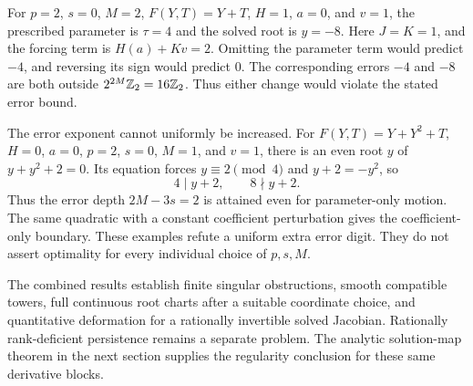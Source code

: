 \begin{example}\label{ex:motion-boundary}
For $p=2$, $s=0$, $M=2$, $F(Y,T)=Y+T$, $H=1$, $a=0$, and $v=1$,
the prescribed parameter is $\tau=4$ and the solved root is $y=-8$.
Here $J=K=1$, and the forcing term is $H(a)+Kv=2$. Omitting the parameter
term would predict $-4$, and reversing its sign would predict $0$.
The corresponding errors $-4$ and $-8$ are both outside
$2^{2M}\mathbb Z_2=16\mathbb Z_2$. Thus either change would violate the stated error
bound.

The error exponent cannot uniformly be increased. For
$F(Y,T)=Y+Y^2+T$, $H=0$, $a=0$, $p=2$, $s=0$, $M=1$, and $v=1$,
there is an even root $y$ of $y+y^2+2=0$. Its equation forces
$y\equiv2\pmod4$ and $y+2=-y^2$, so
\[
 4\mid y+2,\qquad 8\nmid y+2.
\]
Thus the error depth $2M-3s=2$ is attained even for parameter-only motion.
The same quadratic with a constant coefficient perturbation gives the
coefficient-only boundary. These examples refute a uniform extra error
digit. They do not assert optimality for every individual choice of
$p,s,M$.
\end{example}

The combined results establish finite singular obstructions, smooth
compatible towers, full continuous root charts after a suitable coordinate
choice, and quantitative deformation for a rationally invertible solved
Jacobian. Rationally rank-deficient persistence remains a separate problem.
The analytic solution-map theorem in the next section supplies the
regularity conclusion for these same derivative blocks.
